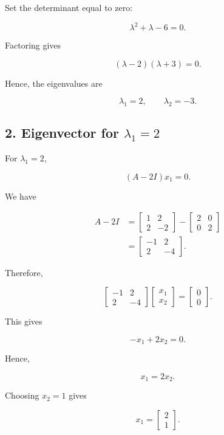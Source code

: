 \documentclass[12pt]{article}
\begin{document}
	Set the determinant equal to zero:
	
	\[
	\lambda^2+\lambda-6=0.
	\]
	
	Factoring gives
	
	\[
	(\lambda-2)(\lambda+3)=0.
	\]
	
	Hence, the eigenvalues are
	
	\[
	\boxed{\lambda_1=2,\qquad\lambda_2=-3}.
	\]
	
	\subsection*{2. Eigenvector for $\lambda_1=2$}
	
	For $\lambda_1=2$,
	
	\[
	(A-2I)x_1=0.
	\]
	
	We have
	
	\[
	\begin{aligned}
		A-2I
		&=
		\begin{bmatrix}
			1&2\\
			2&-2
		\end{bmatrix}
		-
		\begin{bmatrix}
			2&0\\
			0&2
		\end{bmatrix}\\
		&=
		\begin{bmatrix}
			-1&2\\
			2&-4
		\end{bmatrix}.
	\end{aligned}
	\]
	
	Therefore,
	
	\[
	\begin{bmatrix}
		-1&2\\
		2&-4
	\end{bmatrix}
	\begin{bmatrix}
		x_1\\
		x_2
	\end{bmatrix}
	=
	\begin{bmatrix}
		0\\
		0
	\end{bmatrix}.
	\]
	
	This gives
	
	\[
	-x_1+2x_2=0.
	\]
	
	Hence,
	
	\[
	x_1=2x_2.
	\]
	
	Choosing $x_2=1$ gives
	
	\[
	\boxed{
		x_1=
		\begin{bmatrix}
			2\\
			1
		\end{bmatrix}
	}.
	\]
	
\end{document}
